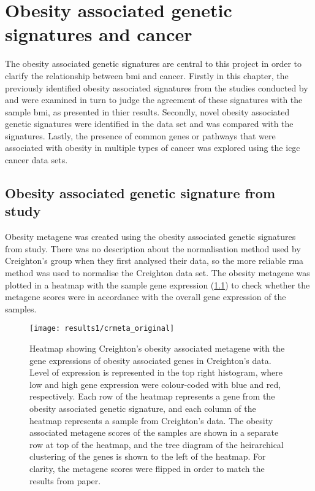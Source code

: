 \chapter{Obesity associated genetic signatures and cancer}
\label{cha:obesity_genetic_signatures_and_cancer}

The obesity associated genetic signatures are central to this project in order to clarify the relationship between \gls{bmi} and cancer.
Firstly in this chapter, the previously identified obesity associated signatures from the studies conducted by \citet{Creighton2012} and \citet{Fuentes-Mattei2014} were examined in turn to judge the agreement of these signatures with the sample \gls{bmi}, as presented in thier results.
Secondly, novel obesity associated genetic signatures were identified in the \citet{Creighton2012} data set and was compared with the signatures.
Lastly, the presence of common genes or pathways that were associated with obesity in multiple types of cancer was explored using the \gls{icgc} cancer data sets.

\section{Obesity associated genetic signature from \citet{Creighton2012} study}
\label{sec:creighton_obesity_metagene}

Obesity metagene was created using the obesity associated genetic signatures from \citet{Creighton2012} study.
There was no description about the normalisation method used by Creighton's group when they first analysed their data, so the more reliable \gls{rma} method was used to  normalise the Creighton data set.
The obesity metagene was plotted in a heatmap with the sample gene expression (\cref{fig:crmetaheat1}) to check whether the metagene scores were in accordance with the overall gene expression of the samples.

\begin{figure}[htb]
	\centering
	\texttt{[image: results1/crmeta\_original]}
	\caption[Heatmap of Creighton's metagene in Creighton's data]{Heatmap showing Creighton's obesity associated metagene with the gene expressions of obesity associated genes in Creighton's data. Level of expression is represented in the top right histogram, where low and high gene expression were colour-coded with blue and red, respectively. Each row of the heatmap represents a gene from the obesity associated genetic signature, and each column of the heatmap represents a sample from Creighton's data. The obesity associated metagene scores of the samples are shown in a separate row at top of the heatmap, and the tree diagram of the heirarchical clustering of the genes is shown to the left of the heatmap. For clarity, the metagene scores were flipped in order to match the results from \citet{Creighton2012} paper.}
	\label{fig:crmetaheat1}
\end{figure}

